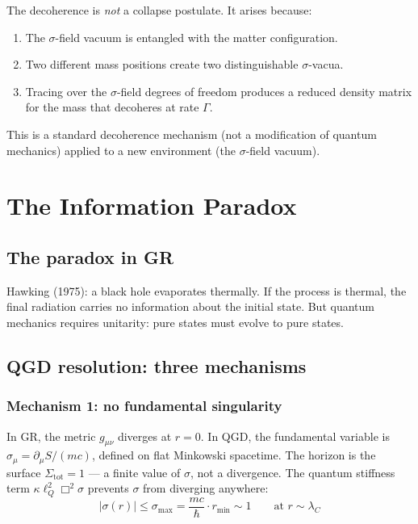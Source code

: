 \documentclass[11pt,a4paper]{article}
\theoremstyle{plain}
\theoremstyle{definition}
\theoremstyle{remark}
\newcommand{\lQ}{\ell_Q}
\begin{document}
The decoherence is \emph{not} a collapse postulate.  It arises because:
\begin{enumerate}
  \item The $\sigma$-field vacuum is entangled with the matter configuration.
  \item Two different mass positions create two distinguishable $\sigma$-vacua.
  \item Tracing over the $\sigma$-field degrees of freedom produces a reduced density matrix for the mass that decoheres at rate $\Gamma$.
\end{enumerate}

This is a standard decoherence mechanism (not a modification of quantum mechanics) applied to a new environment (the $\sigma$-field vacuum).

\section{The Information Paradox}
\label{sec:information}

\subsection{The paradox in GR}

Hawking (1975): a black hole evaporates thermally.  If the process is thermal, the final radiation carries no information about the initial state.  But quantum mechanics requires unitarity: pure states must evolve to pure states.

\subsection{QGD resolution: three mechanisms}

\subsubsection{Mechanism 1: no fundamental singularity}

In GR, the metric $g_{\mu\nu}$ diverges at $r = 0$.  In QGD, the fundamental variable is $\sigma_\mu = \partial_\mu S/(mc)$, defined on flat Minkowski spacetime.  The horizon is the surface $\Sigma_{\mathrm{tot}} = 1$ --- a finite value of $\sigma$, not a divergence.  The quantum stiffness term $\kappa\lQ^2\Box^2\sigma$ prevents $\sigma$ from diverging anywhere:
\begin{equation}
  |\sigma(r)| \leq \sigma_{\max} = \frac{mc}{\hbar}\cdot r_{\min} \sim 1 \qquad\text{at } r \sim \lambda_C
\end{equation}
\end{document}
